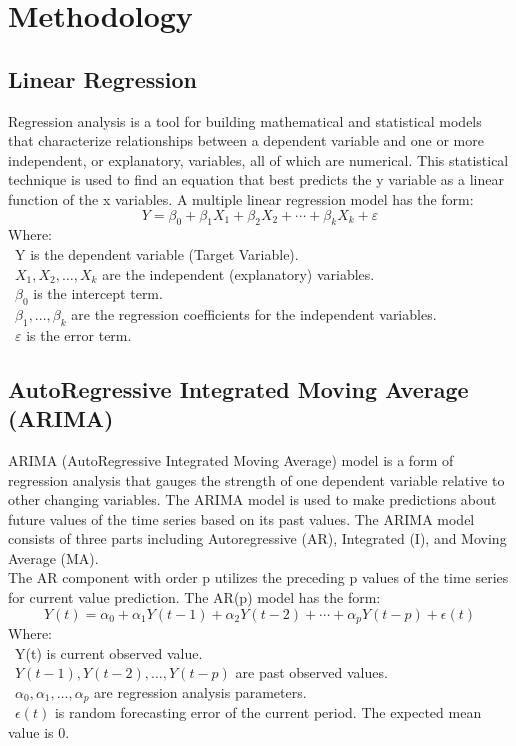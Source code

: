 \documentclass{ieeeojies}
\begin{document}
\section{Methodology}

\subsection{Linear Regression}
Regression analysis is a tool for building mathematical and statistical models that characterize relationships between a dependent variable and one or more independent, or explanatory, variables, all of which are numerical. This statistical technique is used to find an equation that best predicts the y variable as a linear function of the x variables.
A multiple linear regression model has the form: 
\[Y=\beta_0+\beta_1X_1+\beta_2X_2+\cdots+\beta_kX_k+\varepsilon\]
Where:\\
	\indent\textbullet\ Y is the dependent variable (Target Variable).\\
	\indent\textbullet\ \(X_1, X_2, \ldots, X_k\) are the independent (explanatory) variables.\\
	\indent\textbullet\ \(\beta_0\) is the intercept term.\\
	\indent\textbullet\ \(\beta_1,..., \beta_k\) are the regression coefficients for the independent variables.\\
	\indent\textbullet\ \(\varepsilon\) is the error term.

 \subsection{AutoRegressive Integrated Moving Average (ARIMA)}
 ARIMA (AutoRegressive Integrated Moving Average) model is a form of regression analysis that gauges the strength of one dependent variable relative to other changing variables. The ARIMA model is used to make predictions about future values of the time series based on its past values. The ARIMA model consists of three parts including Autoregressive (AR), Integrated (I), and Moving Average (MA).\\ 
 
 The AR component with order p utilizes the preceding p values of the time series for current value prediction. The AR(p) model has the form:
 \[Y(t)=\alpha_0+\alpha_1Y(t-1)+\alpha_2Y(t-2)+\cdots+\alpha_pY(t-p)+\epsilon(t)\]
         Where:\\
	     \indent\textbullet\ Y(t) is current observed value.\\
          \indent\textbullet\ \(Y(t-1), Y(t-2), \ldots, Y(t-p)\) are past observed values.\\
          \indent\textbullet\ \(\alpha_0, \alpha_1, \ldots, \alpha_p\) are regression analysis parameters.\\
          \indent\textbullet\ \(\epsilon(t)\) is random forecasting error of the current period. The expected mean value is 0.\\
            
\end{document}
